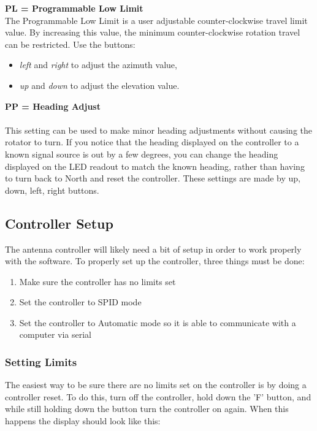 \documentclass[11pt]{article} %
\begin{document}
\textbf{PL = Programmable Low Limit}
\\
The Programmable Low Limit is a user adjustable counter-clockwise travel limit value. By increasing this value, the minimum counter-clockwise rotation travel can be restricted. Use the buttons:
\begin{itemize}
\item \emph{left} and \emph{right} to adjust the azimuth value,
\item \emph{up} and \emph{down} to adjust the elevation value.
\end{itemize}
\textbf{PP = Heading Adjust}
\\ \\
This setting can be used to make minor heading adjustments without causing the rotator to turn. If you notice that the heading displayed on the controller to a known signal source is out by a few degrees, you can change the heading displayed on the LED readout to match the known heading, rather than having to turn back to North and reset the controller. These settings are made by up, down, left, right buttons.






\subsection{Controller Setup}


The antenna controller will likely need a bit of setup in order to work properly with the software. To properly set up the controller, three things must be done: 

\begin{enumerate}
\item Make sure the controller has no limits set
\item Set the controller to SPID mode
\item Set the controller to Automatic mode so it is able to communicate with a computer via serial
\end{enumerate}

\subsubsection{Setting Limits}

The easiest way to be sure there are no limits set on the controller is by doing a controller reset. To do this, turn off the controller, hold down the 'F' button, and while still holding down the button turn the controller on again. When this happens the display should look like this:
\end{document}
